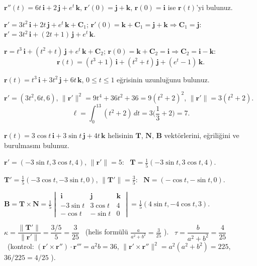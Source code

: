 \begin{soru}
$\mathbf r''(t)=6t\,\mathbf i+2\,\mathbf j+e^t\,\mathbf k$, $\mathbf r'(0)=\mathbf j+\mathbf k$, $\mathbf r(0)=\mathbf i$ ise $\mathbf r(t)$'yi bulunuz.
\end{soru}
\begin{cevap}
$\mathbf r'=3t^2\,\mathbf i+2t\,\mathbf j+e^t\,\mathbf k+\mathbf C_1$; $\mathbf r'(0)=\mathbf k+\mathbf C_1=\mathbf j+\mathbf k\Rightarrow\mathbf C_1=\mathbf j$:
$\mathbf r'=3t^2\,\mathbf i+(2t+1)\,\mathbf j+e^t\,\mathbf k$.

$\mathbf r=t^3\,\mathbf i+(t^2+t)\,\mathbf j+e^t\,\mathbf k+\mathbf C_2$; $\mathbf r(0)=\mathbf k+\mathbf C_2=\mathbf i\Rightarrow\mathbf C_2=\mathbf i-\mathbf k$:
\[ \mathbf r(t)=(t^3+1)\,\mathbf i+(t^2+t)\,\mathbf j+(e^t-1)\,\mathbf k . \]
\end{cevap}

\begin{soru}
$\mathbf r(t)=t^3\,\mathbf i+3t^2\,\mathbf j+6t\,\mathbf k$, $0\le t\le1$ eğrisinin uzunluğunu bulunuz.
\end{soru}
\begin{cevap}
$\mathbf r'=(3t^2,6t,6)$, $\|\mathbf r'\|^2=9t^4+36t^2+36=9(t^2+2)^2$, $\|\mathbf r'\|=3(t^2+2)$.
\[ \ell=\int_0^13(t^2+2)\,dt=3\Big(\frac13+2\Big)=7 . \]
\end{cevap}

\begin{soru}
$\mathbf r(t)=3\cos t\,\mathbf i+3\sin t\,\mathbf j+4t\,\mathbf k$ helisinin $\mathbf T$, $\mathbf N$, $\mathbf B$ vektörlerini, eğriliğini ve burulmasını bulunuz.
\end{soru}
\begin{cevap}
$\mathbf r'=(-3\sin t,3\cos t,4)$, $\|\mathbf r'\|=5$: \ $\mathbf T=\frac15(-3\sin t,3\cos t,4)$.

$\mathbf T'=\frac15(-3\cos t,-3\sin t,0)$, $\|\mathbf T'\|=\frac35$: \ $\mathbf N=(-\cos t,-\sin t,0)$.

$\mathbf B=\mathbf T\times\mathbf N=\frac15\begin{vmatrix}\mathbf i&\mathbf j&\mathbf k\\-3\sin t&3\cos t&4\\-\cos t&-\sin t&0\end{vmatrix}=\frac15(4\sin t,-4\cos t,3)$.

$\kappa=\dfrac{\|\mathbf T'\|}{\|\mathbf r'\|}=\dfrac{3/5}{5}=\dfrac{3}{25}$ \ (helis formülü $\frac{a}{a^2+b^2}=\frac{3}{25}$ \checkmark). \
$\tau=\dfrac{b}{a^2+b^2}=\dfrac{4}{25}$ \ (kontrol: $(\mathbf r'\times\mathbf r'')\cdot\mathbf r'''=a^2b=36$, $\|\mathbf r'\times\mathbf r''\|^2=a^2(a^2+b^2)=225$, $36/225=4/25$ \checkmark).
\end{cevap}

